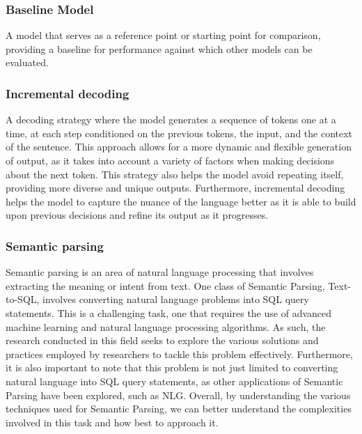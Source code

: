 \subsubsection{Baseline Model}

A model that serves as a reference point or starting point for comparison, providing a baseline for performance against which other models can be evaluated.

\subsubsection{Incremental decoding}

A decoding strategy where the model generates a sequence of tokens one at a time, at each step conditioned on the previous tokens, the input, and the context of the sentence. This approach allows for a more dynamic and flexible generation of output, as it takes into account a variety of factors when making decisions about the next token. This strategy also helps the model avoid repeating itself, providing more diverse and unique outputs. Furthermore, incremental decoding helps the model to capture the nuance of the language better as it is able to build upon previous decisions and refine its output as it progresses\cite{huang-mi-2010-efficient}.

\subsubsection{Semantic parsing}

Semantic parsing\cite{krishnamurthy-etal-2017-neural} is an area of natural language processing that involves extracting the meaning or intent from text. One class of Semantic Parsing, Text-to-SQL, involves converting natural language problems into SQL query statements. This is a challenging task, one that requires the use of advanced machine learning and natural language processing algorithms. As such, the research conducted in this field seeks to explore the various solutions and practices employed by researchers to tackle this problem effectively. Furthermore, it is also important to note that this problem is not just limited to converting natural language into SQL query statements, as other applications of Semantic Parsing have been explored, such as \ac{NLG}. Overall, by understanding the various techniques used for Semantic Parsing, we can better understand the complexities involved in this task and how best to approach it.

